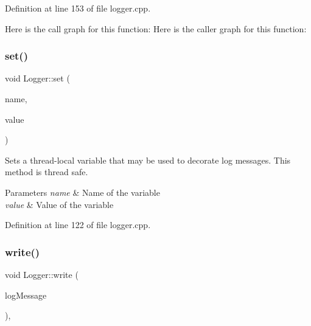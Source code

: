 Definition at line 153 of file logger.\+cpp.

Here is the call graph for this function\+:
Here is the caller graph for this function\+:
\mbox{\label{classstefanfrings_1_1_logger_aeec74ca028bceb107a2337c5f6090432}} 
\subsubsection{\texorpdfstring{set()}{set()}}
{\footnotesize\ttfamily void Logger\+::set (\begin{DoxyParamCaption}\item[{const Q\+String \&}]{name,  }\item[{const Q\+String \&}]{value }\end{DoxyParamCaption})\hspace{0.3cm}{\ttfamily [static]}}

Sets a thread-\/local variable that may be used to decorate log messages. This method is thread safe. 
\begin{DoxyParams}{Parameters}
{\em name} & Name of the variable \\
\hline
{\em value} & Value of the variable \\
\hline
\end{DoxyParams}


Definition at line 122 of file logger.\+cpp.

\mbox{\label{classstefanfrings_1_1_logger_a69f50fe67efaa254ee219f6de384e9fa}} 
\subsubsection{\texorpdfstring{write()}{write()}}
{\footnotesize\ttfamily void Logger\+::write (\begin{DoxyParamCaption}\item[{const \mbox{\hyperlink{classstefanfrings_1_1_log_message}{Log\+Message}} $\ast$}]{log\+Message }\end{DoxyParamCaption})\hspace{0.3cm}{\ttfamily [protected]}, {\ttfamily [virtual]}}

